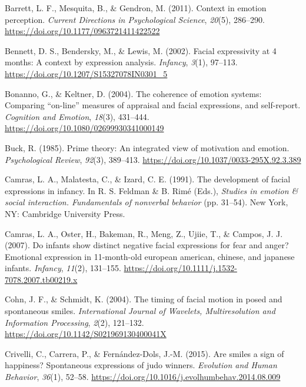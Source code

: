 \documentclass[
  english,
  doc]{apa7}
\newlength{\cslhangindent}
\newenvironment{cslreferences}%
  {\setlength{\parindent}{0pt}%
  \everypar{\setlength{\hangindent}{\cslhangindent}}\ignorespaces}%
  {\par}
\begin{document}
\begin{cslreferences}
\leavevmode\hypertarget{ref-barrett2011context}{}%
Barrett, L. F., Mesquita, B., \& Gendron, M. (2011). Context in emotion perception. \emph{Current Directions in Psychological Science}, \emph{20}(5), 286--290. \url{https://doi.org/10.1177/0963721411422522}

\leavevmode\hypertarget{ref-bennett2002facial}{}%
Bennett, D. S., Bendersky, M., \& Lewis, M. (2002). Facial expressivity at 4 months: A context by expression analysis. \emph{Infancy}, \emph{3}(1), 97--113. \url{https://doi.org/10.1207/S15327078IN0301_5}

\leavevmode\hypertarget{ref-bonanno2004brief}{}%
Bonanno, G., \& Keltner, D. (2004). The coherence of emotion systems: Comparing ``on-line'' measures of appraisal and facial expressions, and self-report. \emph{Cognition and Emotion}, \emph{18}(3), 431--444. \url{https://doi.org/10.1080/02699930341000149}

\leavevmode\hypertarget{ref-buck1985prime}{}%
Buck, R. (1985). Prime theory: An integrated view of motivation and emotion. \emph{Psychological Review}, \emph{92}(3), 389--413. \url{https://doi.org/10.1037/0033-295X.92.3.389}

\leavevmode\hypertarget{ref-camras1991development}{}%
Camras, L. A., Malatesta, C., \& Izard, C. E. (1991). The development of facial expressions in infancy. In R. S. Feldman \& B. Rimé (Eds.), \emph{Studies in emotion \& social interaction. Fundamentals of nonverbal behavior} (pp. 31--54). New York, NY: Cambridge University Press.

\leavevmode\hypertarget{ref-camras2007infants}{}%
Camras, L. A., Oster, H., Bakeman, R., Meng, Z., Ujiie, T., \& Campos, J. J. (2007). Do infants show distinct negative facial expressions for fear and anger? Emotional expression in 11-month-old european american, chinese, and japanese infants. \emph{Infancy}, \emph{11}(2), 131--155. \url{https://doi.org/10.1111/j.1532-7078.2007.tb00219.x}

\leavevmode\hypertarget{ref-cohn2003timing}{}%
Cohn, J. F., \& Schmidt, K. (2004). The timing of facial motion in posed and spontaneous smiles. \emph{International Journal of Wavelets, Multiresolution and Information Processing}, \emph{2}(2), 121--132. \url{https://doi.org/10.1142/S021969130400041X}

\leavevmode\hypertarget{ref-crivelli2015smiles}{}%
Crivelli, C., Carrera, P., \& Fernández-Dols, J.-M. (2015). Are smiles a sign of happiness? Spontaneous expressions of judo winners. \emph{Evolution and Human Behavior}, \emph{36}(1), 52--58. \url{https://doi.org/10.1016/j.evolhumbehav.2014.08.009}


\end{cslreferences}
\end{document}
